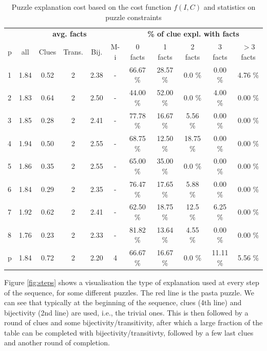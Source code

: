 \begin{table}
	\centering
\begin{tabular}{l|ccccc|ccccc}
    & \multicolumn{5}{c|}{\bf avg. facts} & \multicolumn{5}{c}{\bf \% of clue expl. with facts} \\
p & all & Clues & Trans. & Bij. & M-i & 0 facts & 1 facts & 2 facts & 3 facts &  $>$3 facts \\
\hline
1 &      1.84 &        0.52 &           2 &      2.38 &          - &      66.67 \% &      28.57 \% &        0.0 \% &        0.00 \% &         4.76 \% \\
2 &      1.83 &        0.64 &           2 &       2.50 &          - &       44.00 \% &       52.00 \% &        0.0 \% &        4.00 \% &          0.00 \% \\
3 &      1.85 &        0.28 &           2 &      2.41 &          - &      77.78 \% &      16.67 \% &       5.56 \% &        0.00 \% &          0.00 \% \\
4 &      1.94 &         0.50 &           2 &      2.55 &          - &      68.75 \% &       12.50 \% &      18.75 \% &        0.00 \% &          0.00 \% \\
5 &      1.86 &        0.35 &           2 &      2.55 &          - &       65.00 \% &       35.00 \% &        0.0 \% &        0.00 \% &          0.00 \% \\
6 &      1.84 &        0.29 &           2 &      2.35 &          - &      76.47 \% &      17.65 \% &       5.88 \% &        0.00 \% &          0.00 \% \\
7 &      1.92 &        0.62 &           2 &      2.41 &          - &       62.50 \% &      18.75 \% &       12.5 \% &       6.25 \% &          0.00 \% \\
8 &      1.76 &        0.23 &           2 &      2.33 &          - &      81.82 \% &      13.64 \% &       4.55 \% &        0.00 \% &          0.00 \% \\
p &      1.84 &        0.72 &           2 &       2.20 &          4 &      66.67 \% &      16.67 \% &        0.0 \% &      11.11 \% &         5.56 \% \\
\end{tabular}
\caption{Puzzle explanation cost based on the cost function $f(I, C)$ and statistics on puzzle constraints}
\label{table:sequence_leve}
\end{table}

Figure \ref{fig:steps} shows a visualisation the type of explanation used at every step of the sequence, for some different puzzles. 
The red line is the pasta puzzle. 
We can see that typically at the beginning of the sequence, clues (4th line) and bijectivity (2nd line) are used, i.e., the trivial ones. 
This is then followed by a round of clues and some bijectivity/transitivity, after which a large fraction of the table can be completed with bijectivity/transitivty, followed by a few last clues and another round of completion.

